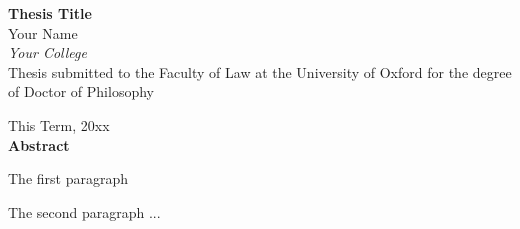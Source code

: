 




\begin{quoting}
  \singlespace
    \begin{center}
  {\LARGE \bfseries  Thesis Title}\\
  \vspace*{0.5cm}
      {\large Your Name}\\
  \vspace*{0.1cm}  
      {\large \emph{Your College}}\\
  \vspace*{0.2cm}  
    {\normalsize Thesis submitted to the Faculty of Law at the University of Oxford for the degree of Doctor of Philosophy}

  \vspace*{0.2cm}  
    {\normalsize This Term, 20xx}\\
  \vspace*{0.5cm}  
    {\normalsize \bfseries Abstract}      
  \end{center}
  {\parindent0pt
The first paragraph 
}
\vspace{0.7mm}

The second paragraph ... 

\end{quoting}




